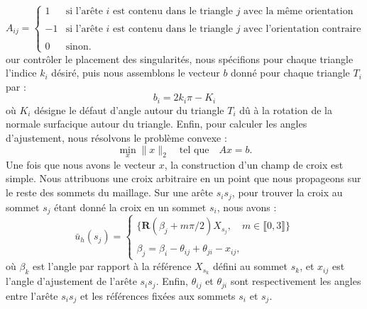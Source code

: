 $$A_{ij} =
\begin{cases}
1 & \text{si l'arête } i \text{ est contenu dans le triangle } j \text{ avec la même orientation} \\\\
-1 & \text{si l'arête } i \text{ est contenu dans le triangle } j \text{ avec l'orientation contraire} \\\\
0 & \text{sinon}.
\end{cases}
$$
our contrôler le placement des singularités, nous spécifions pour chaque triangle l'indice $k_i$ désiré, puis nous assemblons le vecteur $b$ donné pour chaque triangle $T_i$ par :
$$
b_i = 2k_i\pi-K_i
$$
où $K_i$ désigne le défaut d'angle autour du triangle $T_i$ dû à la rotation de la normale surfacique autour du triangle. Enfin, pour calculer les angles d'ajustement, nous résolvons le problème convexe :
\[
\min_x \|x\|_2 \quad \text{tel que} \quad Ax = b.
\]
Une fois que nous avons le vecteur $x$, la construction d'un champ de croix est simple. Nous attribuons une croix arbitraire en un point que nous propageons sur le reste des sommets du maillage. Sur une arête $s_is_j$, pour trouver la croix au sommet $s_j$ étant donné la croix en un sommet $s_i$, nous avons :
$$
\bar{u}_h(s_j)=
\begin{cases}
\{\mathbf{R}(\beta_j+m\pi/2)X_{s_j},\quad m\in\llbracket0, 3\rrbracket\}\\\\
\beta_j = \beta_i - \theta_{ij} + \theta_{ji} - x_{ij},
\end{cases}
$$
où $\beta_k$ est l'angle par rapport à la référence $X_{s_k}$ défini au sommet $s_k$, et $x_{ij}$ est l'angle d'ajustement de l'arête $s_is_j$. Enfin, $\theta_{ij}$ et $\theta_{ji}$ sont respectivement les angles entre l'arête $s_is_j$ et les références fixées aux sommets $s_i$ et $s_j$.

